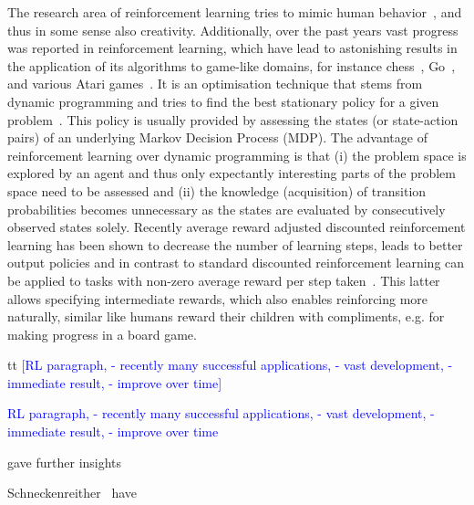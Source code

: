 \documentclass[envcountsame]{llncs}
\newcommand\MS[2][r]{\ifx t#1 \textcolor{blue}{[#2]}%
\else \begin{center}\textcolor{blue}{#2} \end{center} \fi}%
\begin{document}
The research area of reinforcement learning tries to mimic human
behavior~\cite{schneckenreither2020average}, and thus in some sense also creativity. Additionally,
over the past years vast progress was reported in reinforcement learning, which have lead to
astonishing results in the application of its algorithms to game-like domains, for instance
chess~\cite{Silver17_MasteringChessAndShogiBySelfPlayWithAGeneralReinforcementLearningAlgorithm},
Go~\cite{Silver16_MasteringTheGameOfGoWithDeepNeuralNetworksAndTreeSearch}, and various Atari
games~\cite{Mnih15_HumanlevelControlThroughDeepReinforcementLearningb}. It is an optimisation
technique that stems from dynamic programming and tries to find the best stationary policy for a
given problem~\cite{sutton1998introduction}. This policy is usually provided by assessing the states
(or state-action pairs) of an underlying Markov Decision Process (MDP). The advantage of
reinforcement learning over dynamic programming is that (i) the problem space is explored by an
agent and thus only expectantly interesting parts of the problem space need to be assessed and (ii)
the knowledge (acquisition) of transition probabilities becomes unnecessary as the states are
evaluated by consecutively observed states solely\cite{sutton1998introduction}. Recently average
reward adjusted discounted reinforcement learning has been shown to decrease the number of learning
steps, leads to better output policies and in contrast to standard discounted reinforcement learning
can be applied to tasks with non-zero average reward per step
taken~\cite{schneckenreither2020average}. This latter allows specifying intermediate rewards, which
also enables reinforcing more naturally, similar like humans reward their children with compliments,
e.g\@. for making progress in a board game. 


\MS[t]{RL paragraph, - recently many successful applications, - vast development, - immediate result,
  - improve over time}


gave further insights 

Schneckenreither~\cite{schneckenreither2020average} have 
\end{document}
